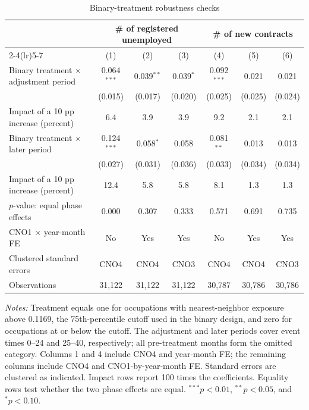 \begin{table}[!htbp]
\centering
\caption{Binary-treatment robustness checks}
\label{tab:v1_binary_treatment}
\begin{threeparttable}
\scriptsize
\setlength{\tabcolsep}{3.5pt}
\begin{tabular}{lcccccc}
\toprule
& \multicolumn{3}{c}{\# of registered unemployed} & \multicolumn{3}{c}{\# of new contracts} \\
\cmidrule(lr){2-4}\cmidrule(lr){5-7}
& (1) & (2) & (3) & (4) & (5) & (6) \\
\midrule
Binary treatment $\times$ adjustment period & 0.064$^{***}$ & 0.039$^{**}$ & 0.039$^{*}$ & 0.092$^{***}$ & 0.021 & 0.021 \\
 & (0.015) & (0.017) & (0.020) & (0.025) & (0.025) & (0.024) \\
Impact of a 10 pp increase (percent) & 6.4 & 3.9 & 3.9 & 9.2 & 2.1 & 2.1 \\
\addlinespace
Binary treatment $\times$ later period & 0.124$^{***}$ & 0.058$^{*}$ & 0.058 & 0.081$^{**}$ & 0.013 & 0.013 \\
 & (0.027) & (0.031) & (0.036) & (0.033) & (0.034) & (0.034) \\
Impact of a 10 pp increase (percent) & 12.4 & 5.8 & 5.8 & 8.1 & 1.3 & 1.3 \\
$p$-value: equal phase effects & 0.000 & 0.307 & 0.333 & 0.571 & 0.691 & 0.735 \\
\midrule
CNO1 $\times$ year-month FE & No & Yes & Yes & No & Yes & Yes \\
Clustered standard errors & CNO4 & CNO4 & CNO3 & CNO4 & CNO4 & CNO3 \\
Observations & 31,122 & 31,122 & 31,122 & 30,787 & 30,786 & 30,786 \\
\bottomrule
\end{tabular}
\begin{tablenotes}[flushleft]
\footnotesize
\item \emph{Notes:} Treatment equals one for occupations with nearest-neighbor exposure above 0.1169, the 75th-percentile cutoff used in the binary design, and zero for occupations at or below the cutoff. The adjustment and later periods cover event times 0--24 and 25--40, respectively; all pre-treatment months form the omitted category. Columns 1 and 4 include CNO4 and year-month FE; the remaining columns include CNO4 and CNO1-by-year-month FE. Standard errors are clustered as indicated. Impact rows report 100 times the coefficients. Equality rows test whether the two phase effects are equal. $^{***}p<0.01$, $^{**}p<0.05$, and $^{*}p<0.10$.
\end{tablenotes}
\end{threeparttable}
\end{table}
